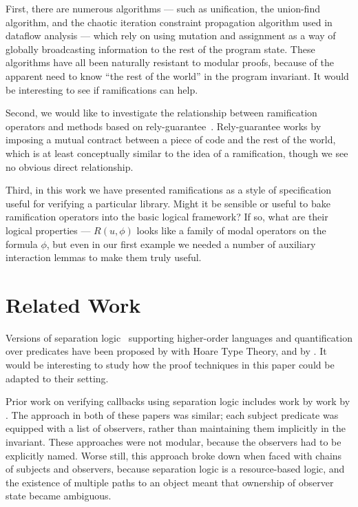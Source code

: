 First, there are numerous algorithms --- such as unification, the
union-find algorithm, and the chaotic iteration constraint propagation
algorithm used in dataflow analysis --- which rely on using mutation
and assignment as a way of globally broadcasting information to the
rest of the program state. These algorithms have all been naturally
resistant to modular proofs, because of the apparent need to know
``the rest of the world'' in the program invariant. It would be
interesting to see if ramifications can help.

Second, we would like to investigate the relationship between
ramification operators and methods based on
rely-guarantee~\cite{rely-guarantee-jones}. Rely-guarantee works by
imposing a mutual contract between a piece of code and the rest of the
world, which is at least conceptually similar to the idea of a
ramification, though we see no obvious direct relationship.

Third, in this work we have presented ramifications as a style of
specification useful for verifying a particular library. Might it be
sensible or useful to bake ramification operators into the basic
logical framework? If so, what are their logical properties --- $R(u,
\phi)$ looks like a family of modal operators on the formula $\phi$, but
even in our first example we needed a number of auxiliary interaction
lemmas to make them truly useful.

\section{Related Work}

Versions of separation logic~\cite{sep-logic} supporting higher-order
languages and quantification over predicates have been proposed by
\citet{htt} with Hoare Type Theory, and by
\citet{parkinson-bierman}. It would be interesting to study how the
proof techniques in this paper could be adapted to their setting.

Prior work on verifying callbacks using separation logic includes work
by \citet{tldi09,ftfjp07} work by
\citet{parkinson-iwaco-07}. The approach in both of these
papers was similar; each subject predicate was equipped with a list of
observers, rather than maintaining them implicitly in the
invariant. These approaches were not modular, because the observers
had to be explicitly named. Worse still, this approach broke down when
faced with chains of subjects and observers, because separation logic
is a resource-based logic, and the existence of multiple paths to an
object meant that ownership of observer state became ambiguous.

